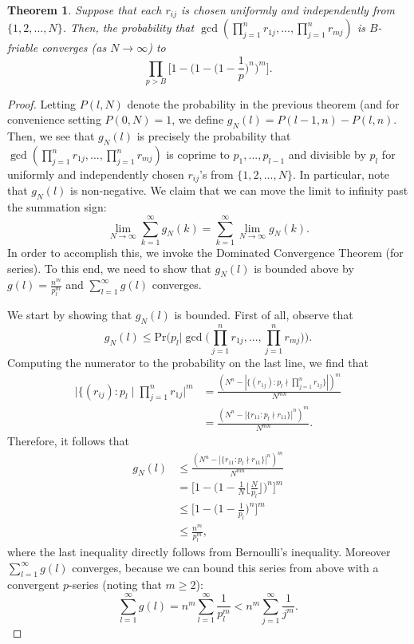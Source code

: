 \documentclass[12pt]{amsart}
\newtheorem{theorem}{Theorem}[subsection]
\theoremstyle{definition}
\begin{document}
\begin{theorem} Suppose that each $r_{ij}$ is chosen uniformly and independently from $\{1, 2, ..., N\}$. Then, the probability that $\gcd(\prod_{j=1}^n r_{1j}, ... , \prod_{j=1}^n r_{mj})$ is $B$-friable converges (as $N \to \infty$) to
	$$\prod_{p>B} \Big[1 - \Big(1 - \Big(1 - \frac{1}{p}\Big)^n \Big)^m \Big].$$
\end{theorem}

\begin{proof}
	Letting $P(l, N)$ denote the probability in the previous theorem (and for convenience setting $P(0, N) = 1$, we define $g_N(l) = P(l-1, n) - P(l, n)$. Then, we see that $g_N(l)$ is precisely the probability that $\gcd(\prod_{j=1}^n r_{1j}, ... , \prod_{j=1}^n r_{mj})$ is coprime to $p_1, ..., p_{l-1}$ and divisible by $p_l$ for uniformly and independently chosen $r_{ij}$'s from $\{1, 2, ..., N\}$. In particular, note that $g_N(l)$ is non-negative. We claim that we can move the limit to infinity past the summation sign:
	$$\lim_{N \to \infty} \sum_{k=1}^{\infty} g_N(k) = \sum_{k=1}^{\infty} \lim_{N \to \infty} g_N(k).$$
	In order to accomplish this, we invoke the Dominated Convergence Theorem (for series). To this end, we need to show that $g_N(l)$ is bounded above by $g(l) = \frac{n^m}{p_l^m}$ and $\sum_{l=1}^{\infty} g(l)$ converges.
	
	We start by showing that $g_N(l)$ is bounded. First of all, observe that
	$$g_N(l) \leq \text{Pr}\Big(p_l \Big| \gcd\Big(\prod_{j=1}^n r_{1j}, ... , \prod_{j=1}^n r_{mj}\Big)\Big).$$
	Computing the numerator to the probability on the last line, we find that
	\begin{align*} 
		\Big|\{(r_{ij}) : p_l \mid \prod_{j=1}^n r_{1j}\Big|^m &= \frac{(N^n - |\{(r_{1j}) : p_l \nmid \prod_{j=1}^n r_{1j}\}|)^m}{N^{mn}}\\
		&= \frac{(N^n - |\{r_{11} : p_l \nmid r_{11}\}|^n)^m}{N^{mn}}. \end{align*}
	Therefore, it follows that
	\begin{align*} 
		g_N(l) &\leq \frac{(N^n - |\{r_{11} : p_l \nmid r_{11}\}|^n)^m}{N^{mn}}\\
		&= \Big[1 - \Big(1 - \frac{1}{N} \Big\lfloor \frac{N}{p_l}\Big\rfloor\Big)^n\Big]^m\\
		&\leq \Big[1 - \Big(1 - \frac{1}{p_l}\Big)^n\Big]^m\\
		&\leq \frac{n^m}{p_l^m},\end{align*}
	where the last inequality directly follows from Bernoulli's inequality. Moreover $\sum_{l=1}^{\infty} g(l)$ converges, because we can bound this series from above with a convergent $p$-series (noting that $m \geq 2$):
	$$\sum_{l=1}^{\infty} g(l) = n^m \sum_{l=1}^{\infty} \frac{1}{p_l^m} < n^m \sum_{j=1}^{\infty} \frac{1}{j^m}.$$
	

\end{proof}
\end{document}
